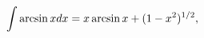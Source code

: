 \[\int\mathop{\mathrm{arcsin}\/}\nolimits xdx=x\mathop{\mathrm{arcsin}\/}%
\nolimits x+(1-x^{2})^{1/2},\]